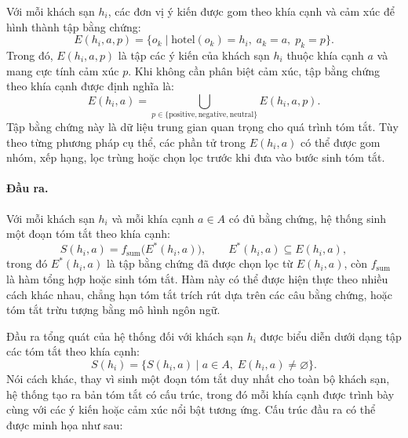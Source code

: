 Với mỗi khách sạn $h_i$, các đơn vị ý kiến được gom theo khía cạnh và cảm
xúc để hình thành tập bằng chứng:
%
\begin{equation}
  E(h_i, a, p)
  =
  \big\{
    o_k
    \mid
    \mathrm{hotel}(o_k) = h_i,\;
    a_k = a,\;
    p_k = p
  \big\}.
  \label{eq:tap-bang-chung-theo-cam-xuc}
\end{equation}
%
Trong đó, $E(h_i, a, p)$ là tập các ý kiến của khách sạn $h_i$ thuộc khía
cạnh $a$ và mang cực tính cảm xúc $p$. Khi không cần phân biệt cảm xúc, tập
bằng chứng theo khía cạnh được định nghĩa là:
%
\begin{equation}
  E(h_i, a)
  =
  \bigcup_{p \in \{\text{positive}, \text{negative}, \text{neutral}\}}
  E(h_i, a, p).
  \label{eq:tap-bang-chung-theo-khia-canh}
\end{equation}
%
Tập bằng chứng này là dữ liệu trung gian quan trọng cho quá trình tóm tắt.
Tùy theo từng phương pháp cụ thể, các phần tử trong $E(h_i,a)$ có thể được
gom nhóm, xếp hạng, lọc trùng hoặc chọn lọc trước khi đưa vào bước sinh tóm
tắt.

\paragraph{Đầu ra.}
Với mỗi khách sạn $h_i$ và mỗi khía cạnh $a \in A$ có đủ bằng chứng, hệ
thống sinh một đoạn tóm tắt theo khía cạnh:
%
\begin{equation}
  S(h_i, a)
  =
  f_{\mathrm{sum}}\big(E^{*}(h_i, a)\big),
  \qquad
  E^{*}(h_i, a) \subseteq E(h_i, a),
  \label{eq:tom-tat-theo-khia-canh}
\end{equation}
%
trong đó $E^{*}(h_i, a)$ là tập bằng chứng đã được chọn lọc từ
$E(h_i,a)$, còn $f_{\mathrm{sum}}$ là hàm tổng hợp hoặc sinh tóm tắt. Hàm
này có thể được hiện thực theo nhiều cách khác nhau, chẳng hạn tóm tắt
trích rút dựa trên các câu bằng chứng, hoặc tóm tắt trừu tượng bằng mô hình
ngôn ngữ.

Đầu ra tổng quát của hệ thống đối với khách sạn $h_i$ được biểu diễn dưới
dạng tập các tóm tắt theo khía cạnh:
%
\begin{equation}
  S(h_i)
  =
  \big\{
    S(h_i, a)
    \mid
    a \in A,\;
    E(h_i, a) \neq \varnothing
  \big\}.
  \label{eq:dau-ra-tong-quat}
\end{equation}
%
Nói cách khác, thay vì sinh một đoạn tóm tắt duy nhất cho toàn bộ khách
sạn, hệ thống tạo ra bản tóm tắt có cấu trúc, trong đó mỗi khía cạnh được
trình bày cùng với các ý kiến hoặc cảm xúc nổi bật tương ứng. Cấu trúc đầu
ra có thể được minh họa như sau:

